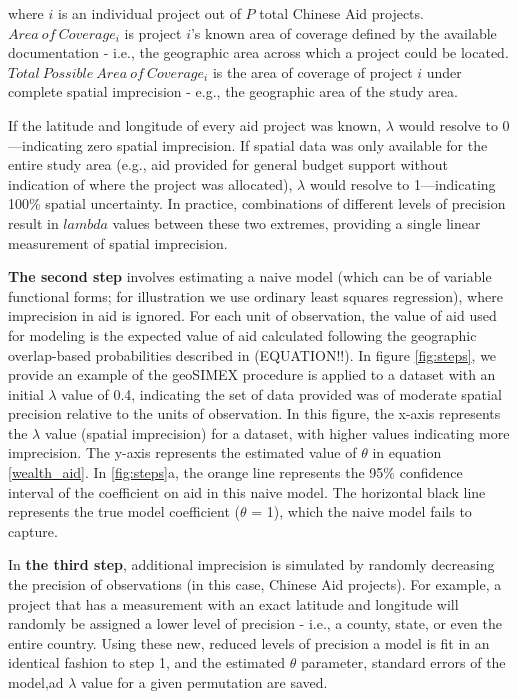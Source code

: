 \noindent where $i$ is an individual project out of $P$ total Chinese Aid projects. $Area \ of \ Coverage_i$ is project $i$'s known area of coverage defined by the available documentation - i.e., the geographic area across which a project could be located. 
$Total \ Possible \ Area \ of \ Coverage_i$ is the area of coverage of project $i$ under complete spatial imprecision - e.g., the geographic area of the study area.
\par
If the latitude and longitude of every aid project was known, $\lambda$ would resolve to 0---indicating zero spatial imprecision. 
If spatial data was only available for the entire study area (e.g., aid provided for general budget support without indication of where the project was allocated), $\lambda$ would resolve to 1---indicating 100\% spatial uncertainty. 
In practice, combinations of different levels of precision result in $lambda$ values between these two extremes, providing a single linear measurement of spatial imprecision.
\par
\textbf{The second step} involves estimating a naive model (which can be of variable functional forms; for illustration we use ordinary least squares regression), where imprecision in aid is ignored. 
For each unit of observation, the value of aid used for modeling is the expected value of aid calculated following the geographic overlap-based probabilities described in (EQUATION!!).
In figure \ref{fig:steps}, we provide an example of the geoSIMEX procedure is applied to a dataset with an initial $\lambda$ value of 0.4, indicating the set of data provided was of moderate spatial precision relative to the units of observation.
In this figure, the x-axis represents the $\lambda$ value (spatial imprecision) for a dataset, with higher values indicating more imprecision.
The y-axis represents the estimated value of $\theta$ in equation \ref{wealth_aid}.
In \ref{fig:steps}a, the orange line represents the 95\% confidence interval of the coefficient on aid in this naive model. 
The horizontal black line represents the true model coefficient ($\theta$ = 1), which the naive model fails to capture.
\par 
In \textbf{the third step}, additional imprecision is simulated by randomly decreasing the precision of observations (in this case, Chinese Aid projects). 
For example, a project that has a measurement with an exact latitude and longitude will randomly be assigned a lower level of precision - i.e., a county, state, or even the entire country. 
Using these new, reduced levels of precision a model is fit in an identical fashion to step 1, and the estimated $\theta$ parameter, standard errors of the model,ad $\lambda$ value for a given permutation are saved.
